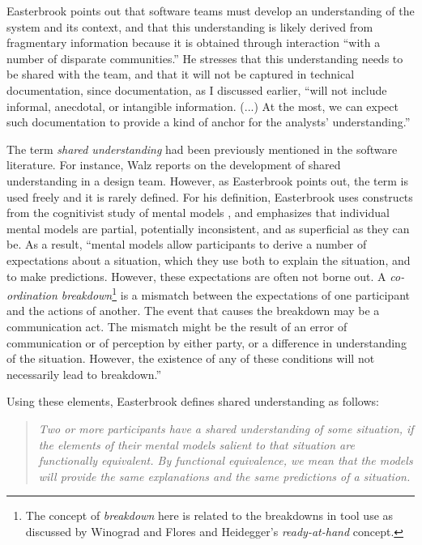 Easterbrook points out that software teams must develop an understanding of the system and its context, and that this understanding is likely derived from fragmentary information because it is obtained through interaction ``with a number of disparate communities.'' He stresses that this understanding needs to be shared with the team, and that it will not be captured in technical documentation, since documentation, as I discussed earlier, ``will not include informal, anecdotal, or intangible information. (...) At the most, we can expect such documentation to provide a kind of anchor for the analysts' understanding.''

The term \emph{shared understanding} had been previously mentioned in the software literature. For instance, Walz  reports on the development of shared understanding in a design team. However, as Easterbrook points out, the term is used freely and it is rarely defined. For his definition, Easterbrook uses constructs from the cognitivist study of mental models \cite{Rogers1992}, and emphasizes that individual mental models are partial, potentially inconsistent, and as superficial as they can be. As a result, ``mental models allow participants to derive a number of expectations about a situation, which they use both to explain the situation, and to make predictions. However, these expectations are often not borne out. A \emph{co-ordination breakdown}\footnote{The concept of \emph{breakdown} here is related to the breakdowns in tool use as discussed by Winograd and Flores  and Heidegger's  \emph{ready-at-hand} concept.} is a mismatch between the expectations of one participant and the actions of another. The event that causes the breakdown may be a communication act. The mismatch might be the result of an error of communication or of perception by either party, or a difference in understanding of the situation. However, the existence of any of these conditions will not necessarily lead to breakdown.''

Using these elements, Easterbrook defines shared understanding as follows:

\begin{quote}
\emph{Two or more participants have a shared understanding of some situation, if the elements of their mental models salient to that situation are functionally equivalent. By functional equivalence, we mean that the models will provide the same explanations and the same predictions of a situation.}
\end{quote}

